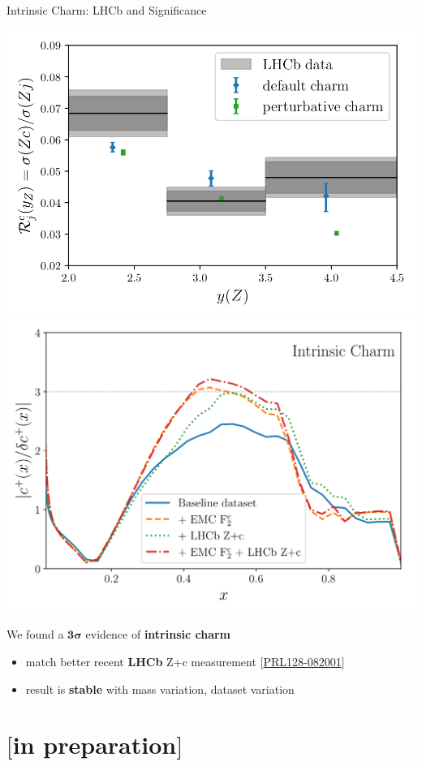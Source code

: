 \documentclass[9pt]{beamer}
\providecommand{\iRef}[1]{{\color{mLightGreen}\small $[$#1$]$}}
\begin{document}
\begin{frame}{Intrinsic Charm: LHCb and Significance}
	\begin{center}
		\includegraphics[width=.47\linewidth]{lhcb-zcharm-pheno.png}%
		\quad%
		\includegraphics[width=.47\linewidth]{pull_baseline_EMC_LHCb_Zc.png}
	\end{center}

    We found a $\bm{3\sigma}$ evidence of \alert{\textbf{intrinsic charm}}
	\begin{itemize}
		\item match better recent \textbf{LHCb} Z+c measurement \iRef{\href{https://doi.org/10.1103/PhysRevLett.128.082001}{PRL128-082001}}
		\item result is \textbf{stable} with mass variation, dataset variation
	\end{itemize}
\end{frame}


\section{\yadism{} \iRef{in preparation}}
\end{document}
